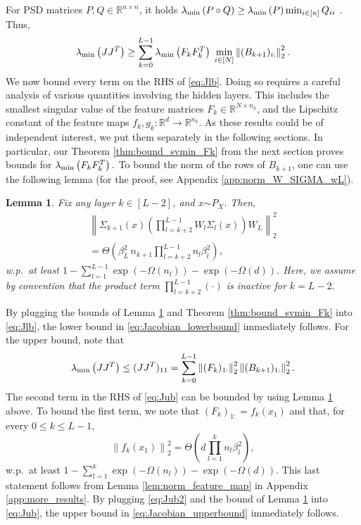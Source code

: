 \documentclass[11pt]{article}
\def\RR{\mathbb{R}}
\newcommand{\distas}[1]{\mathbin{\overset{#1}{\sim}}}
\newtheorem{lemma}[theorem]{Lemma}
\newcommand{\bigOmg}[1]{\Omega\left(#1\right)}
\newcommand{\bigTheta}[1]{\Theta\left(#1\right)}
\newcommand{\bigexp}[1]{\exp\left(#1\right)}
\newcommand{\norm}[1]{\left\|#1\right\|}
\newcommand{\evmin}[1]{\lambda_{\rm min}\left(#1\right)}
\def\min{\mathop{\rm min}\nolimits}
\begin{document}
    
    For PSD matrices $P,Q\in\RR^{n\times n}$, it holds $\evmin{P\circ Q}\geq\evmin{P}\min_{i\in[n]}Q_{ii}$ \citep{schur1911bemerkungen}.
    Thus, 
    \begin{align}\label{eq:Jlb}
	\evmin{JJ^T} \geq
	\sum_{k=0}^{L-1} \evmin{F_k F_k^T}\; 
	\min\limits_{i\in[N]} \norm{(B_{k+1})_{i:}}_2^2.
    \end{align}
    We now bound every term on the RHS of \eqref{eq:Jlb}.
    Doing so requires a careful analysis of various quantities involving the hidden layers.
    This includes the smallest singular value of the feature matrices $F_k\in\RR^{N\times n_k}$,
    and the Lipschitz constant of the feature maps $f_k,g_k:\RR^d\to\RR^{n_k}.$ 
    As these results could be of independent interest, we put them separately in the following sections.
    In particular, our Theorem \ref{thm:bound_svmin_Fk} from the next section proves bounds for $\evmin{F_kF_k^T}.$
    To bound the norm of the rows of $B_{k+1}$, one can use the following lemma (for the proof, see Appendix \ref{app:norm_W_SIGMA_wL}).
    \begin{lemma}\label{lem:norm_W_SIGMA_wL}
	Fix any layer $k\in[L-2]$, and $x\distas{}P_X.$
	Then,
	\begin{align*}
	    \norm{\Sigma_{k+1}(x) \left(\prod_{l=k+2}^{L-1} W_l\Sigma_l(x)\right) W_L }_2^2\\
	    = \bigTheta{\beta_L^2\, n_{k+1} \prod_{l=k+2}^{L-1} n_l\beta_l^2},
	\end{align*}
	w.p.\ at least $1 - \sum_{l=1}^{L-1} \bigexp{-\bigOmg{n_l}} - \exp(-\bigOmg{d})$. %
	Here, we assume by convention that the product term $\prod_{l=k+2}^{L-1}(\cdot)$ is inactive for $k=L-2.$
    \end{lemma}
   By plugging the bounds of Lemma \ref{lem:norm_W_SIGMA_wL} and  Theorem \ref{thm:bound_svmin_Fk} into \eqref{eq:Jlb}, the lower bound in \eqref{eq:Jacobian_lowerbound} immediately follows.
    For the upper bound, note that
    \begin{align}\label{eq:Jub}
	\evmin{JJ^T} 
	\leq (JJ^T)_{11}
	= \sum_{k=0}^{L-1} \norm{(F_k)_{1:}}_2^2 \norm{(B_{k+1})_{1:}}_2^2 .
    \end{align}
    The second term in the RHS of \eqref{eq:Jub} can be bounded by using Lemma \ref{lem:norm_W_SIGMA_wL} above. To bound the first term, we note that $(F_k)_{1:}=f_k(x_1)$ and that, for every $0\leq k\leq L-1$, 
    \begin{equation}\label{eq:Jub2}
    \norm{f_k(x_1)}_2^2 = \bigTheta{ d\prod_{l=1}^k n_l \beta_l^2 },
    \end{equation}
    w.p.\ at least $1-\sum_{l=1}^{k} \bigexp{-\bigOmg{n_l}} - \exp(-\bigOmg{d})$. This last statement follows from Lemma \ref{lem:norm_feature_map} in Appendix \ref{app:more_results}. By plugging \eqref{eq:Jub2} and the bound of Lemma \ref{lem:norm_W_SIGMA_wL} into \eqref{eq:Jub}, the upper bound in \eqref{eq:Jacobian_upperbound} immediately follows.
\end{document}
